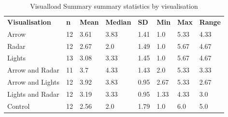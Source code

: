 \begin{table}[]
\caption{Visualload Summary summary statistics by visualisation}
\label{tab:VisualLoad_Summary}
\resizebox{\columnwidth}{!}
\begin{tabular}{llllllll}
\textbf{Visualisation} & \textbf{n} & \textbf{Mean} & \textbf{Median} & \textbf{SD} & \textbf{Min} & \textbf{Max} & \textbf{Range} \\
Arrow                  & 12         & 3.61          & 3.83            & 1.41        & 1.0          & 5.33         & 4.33 \\
Radar                  & 12         & 2.67          & 2.0             & 1.49        & 1.0          & 5.67         & 4.67 \\
Lights                 & 13         & 3.08          & 3.33            & 1.45        & 1.0          & 5.67         & 4.67 \\
Arrow and Radar        & 11         & 3.7           & 4.33            & 1.43        & 2.0          & 5.33         & 3.33 \\
Arrow and Lights       & 12         & 3.92          & 3.83            & 0.95        & 2.67         & 5.33         & 2.67 \\
Lights and Radar       & 12         & 3.19          & 3.33            & 0.95        & 1.33         & 4.33         & 3.0 \\
Control                & 12         & 2.56          & 2.0             & 1.79        & 1.0          & 6.0          & 5.0
\end{tabular}
\end{table}
